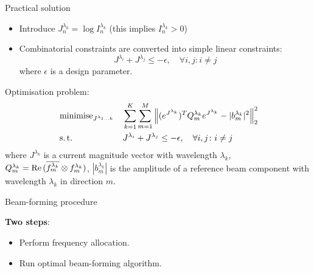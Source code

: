 \documentclass[../main.tex]{subfiles}
\begin{document}
\begin{frame}[t]{Practical solution}

\begin{itemize}
\item Introduce $J^{\lambda_k}_n = \log{I^{\lambda_k}_n}$ (this implies $I^{\lambda_k}_n > 0$)
\item Combinatorial constraints are converted into simple linear constraints:
    \begin{equation*}
  J^{\lambda_i} + J^{\lambda_j} \le -\epsilon, \quad \forall i, j \colon i \ne j
    \end{equation*}
    where $\epsilon$ is a design parameter. 
\end{itemize}

Optimisation problem:
\begin{equation*}
\begin{aligned}
& \operatorname{minimise}_{J^{\lambda_{1\ldots k}}} 
& & \sum_{k=1}^K \sum_{m=1}^M \Big\| (e^{J^{\lambda_{k}}})^T Q^{\lambda_{k}}_m  e^{J^{\lambda_{k}}} - |b^{\lambda_{k}}_m|^2 \Big\|_2^2 \\
& \operatorname{s.t.}
& & J^{\lambda_i} + J^{\lambda_j} \le -\epsilon, \quad \forall i, j \colon i \ne j \\
\end{aligned}
\label{general_problem_formulation3}
\end{equation*}
where $J^{\lambda_{k}}$ is a current magnitude vector with wavelength $\lambda_{k}$, $Q^{\lambda_{k}}_m = \operatorname{Re}{(\overline{f_m^{\lambda_{k}}} \otimes f_m^{\lambda_{k}})}$, $|b^{\lambda_{k}}_m|$ is the amplitude of a reference beam component with wavelength $\lambda_{k}$ in direction $m$.

\end{frame}



\begin{frame}[t]{Beam-forming procedure}
 
\textbf{Two steps}:
\begin{itemize}
    \item Perform frequency allocation.
    \item Run optimal beam-forming algorithm.
\end{itemize}



\end{frame}


%
%
\end{document}
